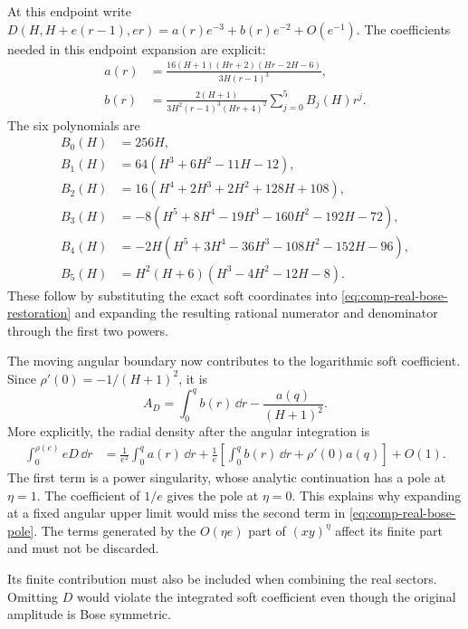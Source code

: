 At this endpoint write
$D(H,H+e(r-1),er)=a(r)e^{-3}+b(r)e^{-2}+O(e^{-1})$.
The coefficients needed in this endpoint expansion are explicit:
\begin{align}
 a(r)&=\frac{16(H+1)(Hr+2)(Hr-2H-6)}{3H(r-1)^3},\\
 b(r)&=\frac{2(H+1)}{3H^2(r-1)^3(Hr+4)^2}
                    \sum_{j=0}^5 B_j(H)r^j.
\end{align}
The six polynomials are
\begin{align}
 B_0(H)&=256 H,\\
 B_1(H)&=64 \left(H^{3} + 6 H^{2} - 11 H - 12\right),\\
 B_2(H)&=16 \left(H^{4} + 2 H^{3} + 2 H^{2} + 128 H + 108\right),\\
 B_3(H)&=- 8 \left(H^{5} + 8 H^{4} - 19 H^{3} - 160 H^{2} - 192 H - 72\right),\\
 B_4(H)&=- 2 H \left(H^{5} + 3 H^{4} - 36 H^{3} - 108 H^{2} - 152 H - 96\right),\\
 B_5(H)&=H^{2} \left(H + 6\right) \left(H^{3} - 4 H^{2} - 12 H - 8\right).
\end{align}
These follow by substituting the exact soft coordinates into
\eqref{eq:comp-real-bose-restoration} and expanding the resulting
rational numerator and denominator through the first two powers.

The moving angular boundary now contributes to the logarithmic
soft coefficient. Since $\rho'(0)=-1/(H+1)^2$, it is
\begin{equation}
 A_D=\int_0^q b(r)\,\dd r-\frac{a(q)}{(H+1)^2}.
 \label{eq:comp-real-bose-pole}
\end{equation}
More explicitly, the radial density after the angular integration is
\begin{align}
 \int_0^{\rho(e)} eD\,\dd r
 &=\frac{1}{e^2}\int_0^q a(r)\,\dd r
   +\frac1e\left[\int_0^q b(r)\,\dd r+\rho'(0)a(q)\right]
   +O(1).
\end{align}
The first term is a power singularity, whose analytic continuation
has a pole at $\eta=1$. The coefficient of $1/e$ gives the pole
at $\eta=0$. This explains why expanding at a fixed angular upper
limit would miss the second term in
\eqref{eq:comp-real-bose-pole}. The terms generated by the
$O(\eta e)$ part of $(xy)^\eta$ affect its finite part and must
not be discarded.

Its finite contribution must also be included when combining the
real sectors. Omitting $D$ would violate the integrated soft
coefficient even though the original amplitude is Bose symmetric.

